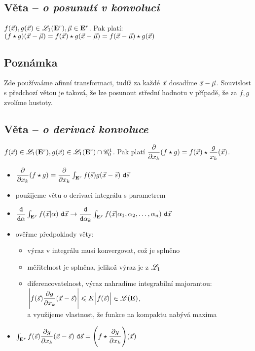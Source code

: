 \subsection{V\v eta -- \emph{o posunut\' i v konvoluci}}\label{posunuti_v_konvoluci}

$f({\vec{x}}), g({\vec{x}})\in {\mathscr L}_1({{\mathbf E}^r}), {\vec{\mu}} \in {{\mathbf E}^r}$. Pak plat\' i: $(f\star g)({\vec{x}} - {\vec{\mu}})= f({\vec{x}})\star g({\vec{x}}- {\vec{\mu}}) =f({\vec{x}} - {\vec{\mu}})\star g({\vec{x}})$\\

\subsection{Pozn\'amka}
Zde pou\v z\' iva\' ame afinn\' i transformaci, tud\' i\v z za ka\v zd\' e ${\vec{x}}$ dosad\' ime ${\vec{x}} - {\vec{\mu}}$. Souvislost s p\v redchoz\' i v\v etou je takov\'a, \v ze lze posunout st\v redn\' i hodnotu v p\v r\' ipad\v e, \v ze za $f,g$ zvol\' ime hustoty.


\subsection{V\v eta -- \emph{o derivaci konvoluce}}\label{derivace_konvoluce}

$f({\vec{x}})\in {\mathscr L}_1({{\mathbf E}^r}), g({\vec{x}})\in {\mathscr L}_1({{\mathbf E}^r}) \cap \mathscr{C}_0^1$. Pak plat\' i $\dfrac{\partial}{\partial x_k}(f\star g)= f({\vec{x}})\star \dfrac{g}{x_k}({\vec{x}})$.\\

\Proof
\begin{itemize}
\item $\dfrac{\partial}{\partial x_k}(f\star g)= \dfrac{\partial}{\partial x_k}\int_{{\mathbf E}^r} f({\vec{s}})g({\vec{x}} - {\vec{s}})~\mathtt{d}{\vec{s}}$
 
\item pou\v zijeme v\v etu o derivaci integr\' alu s parametrem

\item $\dfrac{\mathtt{d}}{\mathtt{d}\alpha}\int_{{\mathbf E}^r} f({\vec{x}} |\alpha)~\mathtt{d}{\vec{x}} \rightarrow \dfrac{\mathtt{d}}{\mathtt{d}\alpha_k}\int_{{\mathbf E}^r} f({\vec{x}} |\alpha_1,\alpha_2,\dots,\alpha_n)~\mathtt{d}{\vec{x}}$

\item ov\v e\v rme p\v redpoklady v\v ety:
		\begin{itemize}
		\item v\'yraz v integr\'alu mus\' i konvergovat, co\v z je spln\v eno
		\item m\v e\v ritelnost je spln\v ena, jeliko\v z v\'yraz je z ${\mathscr L}_1$
		\item diferencovatelnost, v\'yraz nahrad\'ime integrabiln\'i majorantou: $\Bigg|f({\vec{s}})\dfrac{\partial g}{\partial x_k}({\vec{x}} -{\vec{s}})\Bigg| \leqslant K\Big|f({\vec{s}})\Big| \in {\mathscr L}({\mathbf E})$,\\ a vyu\v zijeme vlastnost, \v ze funkce na kompaktu nab\'yv\'a maxima
		\end{itemize}

\item $\int_{{\mathbf E}^r} f({\vec{s}})\dfrac{\partial g}{\partial x_k}({\vec{x}} - {\vec{s}})~\mathtt{d}{\vec{s}}= \Biggl(f\star \dfrac{\partial g}{\partial x_k}\Biggr)({\vec{x}})$
\end{itemize}

